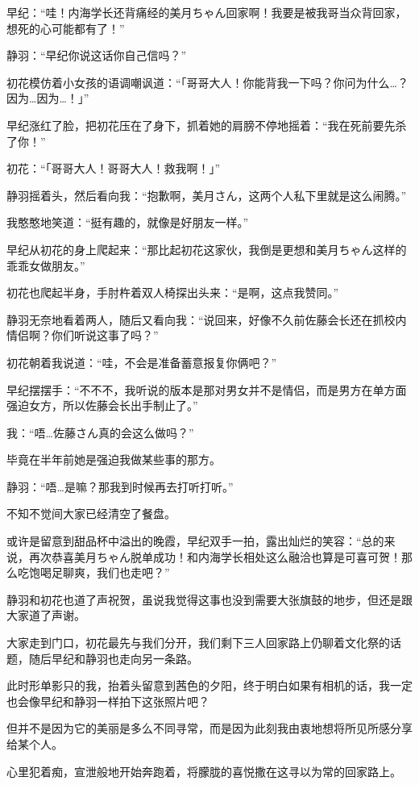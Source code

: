 早纪：“哇！内海学长还背痛经的美月ちゃん回家啊！我要是被我哥当众背回家，想死的心可能都有了！”

静羽：“早纪你说这话你自己信吗？”

初花模仿着小女孩的语调嘲讽道：“「哥哥大人！你能背我一下吗？你问为什么…？因为…{\large{因为…！}}」”

早纪涨红了脸，把初花压在了身下，抓着她的肩膀不停地摇着：“我在死前要先杀了你！”

初花：“「哥哥大人！哥哥大人！救我啊！」”

静羽摇着头，然后看向我：“抱歉啊，美月さん，这两个人私下里就是这么闹腾。”

我憨憨地笑道：“挺有趣的，就像是好朋友一样。”

早纪从初花的身上爬起来：“那比起初花这家伙，我倒是更想和美月ちゃん这样的乖乖女做朋友。”

初花也爬起半身，手肘杵着双人椅探出头来：“是啊，这点我赞同。”

\newday{\cloud\sunset}
静羽无奈地看着两人，随后又看向我：“说回来，好像不久前佐藤会长还在抓校内情侣啊？你们听说这事了吗？”

初花朝着我说道：“哇，不会是准备蓄意报复你俩吧？”

早纪摆摆手：“不不不，我听说的版本是那对男女并不是情侣，而是男方在单方面强迫女方，所以佐藤会长出手制止了。”

我：“唔…佐藤さん真的会这么做吗？”

毕竟在半年前她是强迫我做某些事的那方。

静羽：“唔…是嘛？那我到时候再去打听打听。”

不知不觉间大家已经清空了餐盘。

或许是留意到甜品杯中溢出的晚霞，早纪双手一拍，露出灿烂的笑容：“总的来说，再次恭喜美月ちゃん脱单成功！和内海学长相处这么融洽也算是可喜可贺！那么吃饱喝足聊爽，我们也走吧？”

静羽和初花也道了声祝贺，虽说我觉得这事也没到需要大张旗鼓的地步，但还是跟大家道了声谢。

大家走到门口，初花最先与我们分开，我们剩下三人回家路上仍聊着文化祭的话题，随后早纪和静羽也走向另一条路。

此时形单影只的我，抬着头留意到茜色的夕阳，终于明白如果有相机的话，我一定也会像早纪和静羽一样拍下这张照片吧？

但并不是因为它的美丽是多么不同寻常，而是因为此刻我由衷地想将所见所感分享给某个人。

心里犯着痴，宣泄般地开始奔跑着，将朦胧的喜悦撒在这寻以为常的回家路上。

\cutlinef{\turned}

